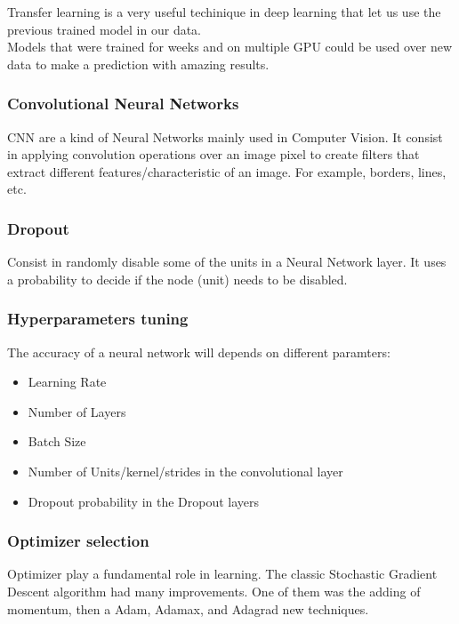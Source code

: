 \documentclass[a4paper,10pt]{article}
\begin{document}
Transfer learning is a very useful techinique in deep learning that let us use the previous trained model in our data. \\

Models that were trained for weeks and on multiple GPU could be used over new data to make a prediction with amazing results. \\

\subsubsection{Convolutional Neural Networks}

CNN are a kind of Neural Networks mainly used in Computer Vision. It consist in applying convolution operations over an image pixel to create filters that extract different features/characteristic of an image. For example, borders, lines, etc. \\


\subsubsection{Dropout}

Consist in randomly disable some of the units in a Neural Network layer. It uses a probability to decide if the node (unit) needs to be disabled. \\ 
 
\subsubsection{Hyperparameters tuning}

The accuracy of a neural network will depends on different paramters:

\begin{itemize}
  \item Learning Rate
  \item Number of Layers
  \item Batch Size
  \item Number of Units/kernel/strides in the convolutional layer
  \item Dropout probability in the Dropout layers
\end{itemize}

\subsubsection{Optimizer selection}

Optimizer play a fundamental role in learning. The classic Stochastic Gradient Descent algorithm had many improvements. One of them was the adding of momentum, then a Adam, Adamax, and Adagrad new techniques. \\
\end{document}
